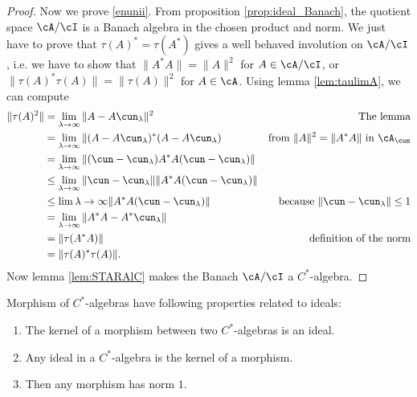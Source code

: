 \begin{proof}
Now we prove \ref{enunii}.
From proposition \ref{prop:ideal_Banach}, the quotient space $\cA/\cI$ is a Banach algebra in the chosen product and  norm. We just have to prove that $\tau(A)^*=\tau(A^*)$ gives a well behaved involution on $\cA/\cI$, i.e. we have to show that $\| A^*A \|=\| A \|^2$ for $A\in\cA/\cI$, or $\| \tau(A)^*\tau(A) \|=\| \tau(A) \|^2$ for $A\in\cA$. Using lemma \ref{lem:taulimA}, we can compute
\begin{equation}
\begin{aligned}
\| \tau(A)^2 \|&=\lim_{\lambda\to\infty}\| A-A\cun_{\lambda} \|^2&\textrm{The lemma}\\
               &=\lim_{\lambda\to\infty}\| (A-A\cun_{\lambda})^*(A-A\cun_{\lambda})&\textrm{from $\| A \|^2=\| A^*A \|$
in $\cA_{\cun}$} \\
               &=\lim_{\lambda\to\infty}\| (\cun-\cun_{\lambda})A^*A(\cun-\cun_{\lambda}) \|\\
               &\leq\lim_{\lambda\to\infty}\| \cun-\cun_{\lambda} \|\| A^*A(\cun-\cun_{\lambda}) \|\\
               &\leq\lim{\lambda\to\infty}\| A^*A(\cun-\cun_{\lambda}) \|&\textrm{because $\| \cun-\cun_{\lambda} \|\leq 1$}\\
               &=\lim_{\lambda\to\infty}\| A^*A-A^*\cun_{\lambda} \|\\
               &=\| \tau(A^*A) \|&\textrm{definition of the norm}\\
               &=\| \tau(A)^*\tau(A) \|.
\end{aligned}
\end{equation}
Now lemma \ref{lem:STARAlC} makes the Banach $\cA/\cI$ a $C^*$-algebra.

\end{proof}

\begin{corollary}
    Morphism of $C^*$-algebras have following properties related to ideals:
    \begin{enumerate}
        \item The kernel of a morphism between two $C^*$-algebras is an ideal.  \label{enupi}
        \item Any ideal in a $C^*$-algebra is the kernel of a morphism.\label{enupii}
        \item Then any morphism has norm $1$.\label{enupiii}
    \end{enumerate}
\end{corollary}

